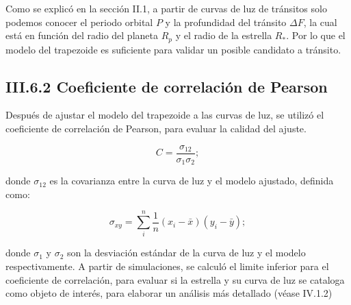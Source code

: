 Como se explicó en la sección II.1, a partir de curvas de luz de tránsitos solo podemos conocer el periodo orbital $P$ y la profundidad del tránsito $\Delta F$, la cual está en función del radio del planeta $R_{p}$ y el radio de la estrella $R_{*}$. Por lo que el modelo del trapezoide es suficiente para validar un posible candidato a tránsito.

\subsection*{III.6.2 Coeficiente de correlación de Pearson}

Después de ajustar el modelo del trapezoide a las curvas de luz, se utilizó el coeficiente de correlación de Pearson, para evaluar la calidad del ajuste. 

\begin{equation}
\displaystyle C=\frac{\sigma_{12}}{\sigma_{1}\sigma_{2}};
\end{equation}
  
donde $\sigma_{12}$ es la covarianza entre la curva de luz y el modelo ajustado, definida como:
  
\begin{equation}
\displaystyle \sigma_{xy}= \sum\limits_{i}^{n} \frac{1}{n}(x_{i}-\bar{x})(y_{i}-\bar{y});
\end{equation}
  
donde $\sigma_{1}$ y $\sigma_{2}$ son la desviación estándar de la curva de luz y el modelo respectivamente. A partir de simulaciones, se calculó el limite inferior para el coeficiente de correlación, para evaluar si la estrella y su curva de luz se cataloga como objeto de interés, para elaborar un análisis más detallado (véase IV.1.2)